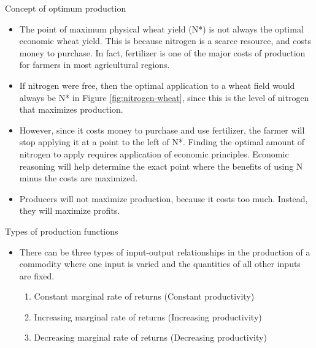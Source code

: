 \documentclass[12pt,ignorenonframetext,aspectratio=169]{beamer}
\providecommand{\tightlist}{%
  \setlength{\itemsep}{0pt}\setlength{\parskip}{0pt}}
\begin{document}
\begin{frame}{Concept of optimum production}
\protect\hypertarget{concept-of-optimum-production}{}
\begin{itemize}
\tightlist
\item
  The point of maximum physical wheat yield (N*) is not always the
  optimal economic wheat yield. This is because nitrogen is a scarce
  resource, and costs money to purchase. In fact, fertilizer is one of
  the major costs of production for farmers in most agricultural
  regions.
\item
  If nitrogen were free, then the optimal application to a wheat field
  would always be N* in Figure \ref{fig:nitrogen-wheat}, since this is
  the level of nitrogen that maximizes production.
\item
  However, since it costs money to purchase and use fertilizer, the
  farmer will stop applying it at a point to the left of N*. Finding the
  optimal amount of nitrogen to apply requires application of economic
  principles. Economic reasoning will help determine the exact point
  where the benefits of using N minus the costs are maximized.
\item
  Producers will not maximize production, because it costs too much.
  Instead, they will maximize profits.
\end{itemize}
\end{frame}

\begin{frame}{Types of production functions}
\protect\hypertarget{types-of-production-functions}{}
\begin{itemize}
\tightlist
\item
  There can be three types of input-output relationships in the
  production of a commodity where one input is varied and the quantities
  of all other inputs are fixed.

  \begin{enumerate}
  \tightlist
  \item
    Constant marginal rate of returns (Constant productivity)
  \item
    Increasing marginal rate of returns (Increasing productivity)
  \item
    Decreasing marginal rate of returns (Decreasing productivity)
  \end{enumerate}
\end{itemize}
\end{frame}
\end{document}
